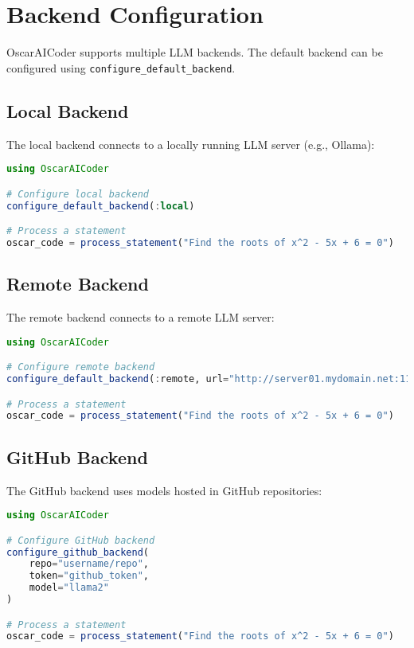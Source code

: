 \documentclass[11pt,a4paper]{article}
\begin{document}
\section{Backend Configuration}

OscarAICoder supports multiple LLM backends. The default backend can be configured using \texttt{configure\_default\_backend}.

\subsection{Local Backend}

The local backend connects to a locally running LLM server (e.g., Ollama):

\begin{lstlisting}[language=Julia]
using OscarAICoder

# Configure local backend
configure_default_backend(:local)

# Process a statement
oscar_code = process_statement("Find the roots of x^2 - 5x + 6 = 0")
\end{lstlisting}

\subsection{Remote Backend}

The remote backend connects to a remote LLM server:

\begin{lstlisting}[language=Julia]
using OscarAICoder

# Configure remote backend
configure_default_backend(:remote, url="http://server01.mydomain.net:11434")

# Process a statement
oscar_code = process_statement("Find the roots of x^2 - 5x + 6 = 0")
\end{lstlisting}

\subsection{GitHub Backend}

The GitHub backend uses models hosted in GitHub repositories:

\begin{lstlisting}[language=Julia]
using OscarAICoder

# Configure GitHub backend
configure_github_backend(
    repo="username/repo",
    token="github_token",
    model="llama2"
)

# Process a statement
oscar_code = process_statement("Find the roots of x^2 - 5x + 6 = 0")
\end{lstlisting}
\end{document}
